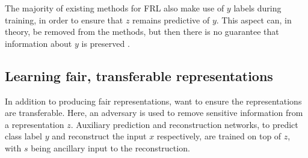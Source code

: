 The majority of existing methods for \ac{FRL} also make use of $y$ labels during training, in order
to ensure that $z$ remains predictive of $y$. 
%
This aspect can, in theory, be removed from the methods, but then there is no guarantee that
information about $y$ is preserved \citep{louizos2016variational}. 
%

\subsection{Learning fair, transferable representations}
In addition to producing fair representations, \citet{madras2018learning} want to ensure the
representations are transferable. Here, an adversary is used to remove sensitive information from
a representation $z$. Auxiliary prediction and reconstruction networks, to predict class label $y$
and reconstruct the input $x$ respectively, are trained on top of $z$, with $s$ being ancillary
input to the reconstruction.

